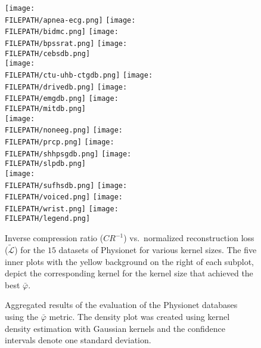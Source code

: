 \documentclass[journal]{IEEEtran}
\providecommand{\FILEPATH}{~/github.com/pbizopoulos/sparsely-activated-networks/packages/default/tmp}
\begin{document}
\begin{figure*}[!t]
  \texttt{[image: \\FILEPATH/apnea-ecg.png]}
  \texttt{[image: \\FILEPATH/bidmc.png]}
  \texttt{[image: \\FILEPATH/bpssrat.png]}
  \texttt{[image: \\FILEPATH/cebsdb.png]}
  \\
  \texttt{[image: \\FILEPATH/ctu-uhb-ctgdb.png]}
  \texttt{[image: \\FILEPATH/drivedb.png]}
  \texttt{[image: \\FILEPATH/emgdb.png]}
  \texttt{[image: \\FILEPATH/mitdb.png]}
  \\
  \texttt{[image: \\FILEPATH/noneeg.png]}
  \texttt{[image: \\FILEPATH/prcp.png]}
  \texttt{[image: \\FILEPATH/shhpsgdb.png]}
  \texttt{[image: \\FILEPATH/slpdb.png]}
  \\
  \texttt{[image: \\FILEPATH/sufhsdb.png]}
  \texttt{[image: \\FILEPATH/voiced.png]}
  \texttt{[image: \\FILEPATH/wrist.png]}
  \texttt{[image: \\FILEPATH/legend.png]}
  \caption{Inverse compression ratio ($CR^{-1}$) vs.\ normalized reconstruction loss ($\tilde{\mathcal{L}}$) for the $15$ datasets of Physionet for various kernel sizes.
  The five inner plots with the yellow background on the right of each subplot, depict the corresponding kernel for the kernel size that achieved the best $\bar\varphi$.}\label{fig:crrl}
\end{figure*}

\begin{figure*}[!t]
  \centering
  \caption{Aggregated results of the evaluation of the Physionet databases using the $\bar\varphi$ metric.
  The density plot was created using kernel density estimation with Gaussian kernels and the confidence intervals denote one standard deviation.}\label{fig:flithos}
\end{figure*}
\end{document}
